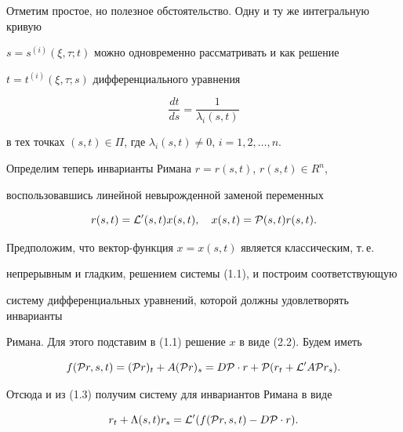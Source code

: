 Отметим простое, но полезное обстоятельство. Одну и ту же интегральную кривую


$s=s^{(i)}(\xi,\tau;t)$ можно одновременно рассматривать и как решение


$t=t^{(i)}(\xi,\tau;s)$ дифференциального уравнения


$$


\frac{dt}{ds}=\frac{1}{\lambda_i(s,t)}


$$


в тех точках $(s,t) \in {\Pi}$, где $\lambda_i(s,t) \neq 0$, $i=1,2,\dotsc,n$.





Определим теперь инварианты Римана $r=r(s,t)$, $r(s,t) \in R^n$,


воспользовавшись линейной невырожденной заменой переменных


\begin{equation}


r(s,t)={\cal L}^{\prime}(s,t) x(s,t), 


\quad x(s,t)={\cal P}(s,t) r(s,t).


\end{equation}





Предположим, что вектор-функция $x=x(s,t)$ является классическим, т.\,е.


непрерывным и гладким, решением системы (1.1), и построим соответствующую 


систему дифференциальных уравнений, которой должны удовлетворять инварианты


Римана. Для этого подставим в (1.1) решение $x$ в виде (2.2). Будем иметь


$$


f({\cal P}r,s,t)=({\cal P}r)_t+A({\cal P}r)_s=D{\cal P}\cdot r +


{\cal P}(r_t+{\cal L}^{\prime}A{\cal P}r_s).


$$


Отсюда и из (1.3) получим систему для инвариантов Римана в виде


\begin{equation}


r_t+\Lambda(s,t)r_s={\cal L}^{\prime} (f({\cal P}r,s,t) - 


D{\cal P}\cdot r).


\end{equation}





